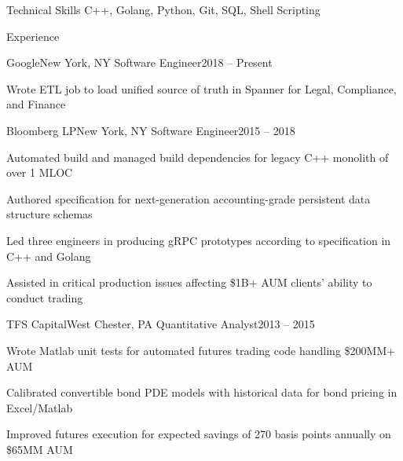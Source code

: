 \documentclass{resume}
\begin{document}

\begin{rSection}{Technical Skills}
C++, Golang, Python, Git, SQL, Shell Scripting
\end{rSection}


\begin{rSection}{Experience}


\begin{rSubsection}{Google}{New York, NY}
{Software Engineer}{2018 -- Present}

\item Wrote ETL job to load unified source of truth
in Spanner for Legal, Compliance, and Finance

\end{rSubsection}

\begin{rSubsection}{Bloomberg LP}{New York, NY}
{Software Engineer}{2015 -- 2018}

\item Automated build and managed build dependencies for legacy
C++ monolith of over 1 MLOC
\item Authored specification for next-generation accounting-grade
persistent data structure schemas
\item Led three engineers in producing gRPC prototypes
according to specification in C++ and Golang
\item Assisted in critical production issues
affecting \$1B+ AUM clients' ability to conduct trading

\end{rSubsection}

\begin{rSubsection}{TFS Capital}{West Chester, PA}
{Quantitative Analyst}{2013 -- 2015}

\item Wrote Matlab unit tests for
automated futures trading code handling \$200MM+ AUM
\item Calibrated convertible bond PDE models with historical
data for bond pricing in Excel\slash Matlab
\item Improved futures execution for expected savings of
270 basis points annually on \$65MM AUM


\end{rSubsection}
\end{rSection}
\end{document}

